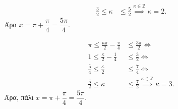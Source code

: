 \begin{alist}
\begin{center}
\begin{minipage}[t]{0.45\textwidth}
\begin{align*}
\frac{3}{2} \le \kappa &\le \frac{5}{2} \overset{\kappa\in\mathbb{Z}}{\implies} \kappa = 2.
\end{align*}
Άρα $x = \pi + \dfrac{\pi}{4} = \dfrac{5\pi}{4}$.
\end{minipage}
\hfill
\begin{minipage}[t]{0.45\textwidth}
\begin{align*}
\pi \le \frac{\kappa\pi}{2} - \frac{\pi}{4} &\le \frac{3\pi}{2} \Leftrightarrow \\
1 \le \frac{\kappa}{2} - \frac{1}{4} &\le \frac{3}{2} \Leftrightarrow \\
\frac{5}{4} \le \frac{\kappa}{2} &\le \frac{7}{4} \Leftrightarrow \\
\frac{5}{2} \le \kappa &\le \frac{7}{2} \overset{\kappa\in\mathbb{Z}}{\implies} \kappa = 3.
\end{align*}
Άρα, πάλι $x = \pi + \dfrac{\pi}{4} = \dfrac{5\pi}{4}$.
\end{minipage}
\end{center}
\end{alist}

